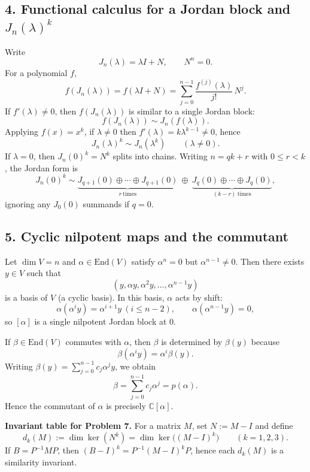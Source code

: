 \documentclass[12pt,a4paper]{article}
\theoremstyle{plain}
\theoremstyle{definition}      %
\begin{document}
\subsection*{4. Functional calculus for a Jordan block and $J_n(\lambda)^k$}
Write
\[
J_n(\lambda)=\lambda I+N,\qquad N^n=0.
\]
For a polynomial $f$,
\[
f(J_n(\lambda))=f(\lambda I+N)=\sum_{j=0}^{n-1}\frac{f^{(j)}(\lambda)}{j!}\,N^j.
\]
If $f'(\lambda)\neq 0$, then $f(J_n(\lambda))$ is similar to a single Jordan block:
\[
f(J_n(\lambda))\sim J_n(f(\lambda)).
\]
Applying $f(x)=x^k$, if $\lambda\neq 0$ then $f'(\lambda)=k\lambda^{k-1}\neq 0$, hence
\[
J_n(\lambda)^k \sim J_n(\lambda^k)\qquad (\lambda\neq 0).
\]
If $\lambda=0$, then $J_n(0)^k=N^k$ splits into chains. Writing $n=qk+r$ with $0\le r<k$,
the Jordan form is
\[
J_n(0)^k \sim \underbrace{J_{q+1}(0)\oplus\cdots\oplus J_{q+1}(0)}_{r\ \text{times}}
\ \oplus\
\underbrace{J_q(0)\oplus\cdots\oplus J_q(0)}_{(k-r)\ \text{times}},
\]
ignoring any $J_0(0)$ summands if $q=0$.

\subsection*{5. Cyclic nilpotent maps and the commutant}
Let $\dim V=n$ and $\alpha\in\mathrm{End}(V)$ satisfy $\alpha^n=0$ but $\alpha^{n-1}\neq 0$.
Then there exists $y\in V$ such that
\[
(y,\alpha y,\alpha^2 y,\dots,\alpha^{n-1}y)
\]
is a basis of $V$ (a cyclic basis). In this basis, $\alpha$ acts by shift:
\[
\alpha(\alpha^i y)=\alpha^{i+1}y \ (i\le n-2),\qquad \alpha(\alpha^{n-1}y)=0,
\]
so $[\alpha]$ is a single nilpotent Jordan block at $0$.

If $\beta\in\mathrm{End}(V)$ commutes with $\alpha$, then $\beta$ is determined by $\beta(y)$ because
\[
\beta(\alpha^i y)=\alpha^i\beta(y).
\]
Writing $\beta(y)=\sum_{j=0}^{n-1} c_j \alpha^j y$, we obtain
\[
\beta=\sum_{j=0}^{n-1} c_j \alpha^j = p(\alpha).
\]
Hence the commutant of $\alpha$ is precisely $\mathbb C[\alpha]$.


\textbf{Invariant table for Problem 7.}
For a matrix $M$, set $N:=M-I$ and define
\[
d_k(M):=\dim\ker(N^k)=\dim\ker\bigl((M-I)^k\bigr)\qquad (k=1,2,3).
\]
If $B=P^{-1}MP$, then $(B-I)^k=P^{-1}(M-I)^kP$, hence each $d_k(M)$ is a similarity invariant.
\end{document}
